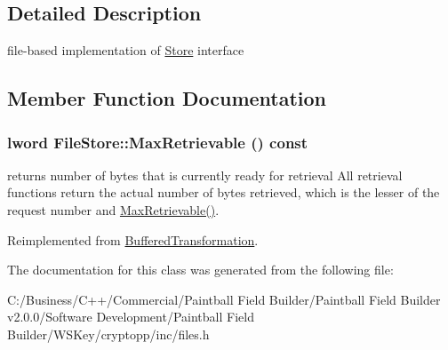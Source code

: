 \subsection{Detailed Description}
file-\/based implementation of \hyperlink{class_store}{Store} interface 

\subsection{Member Function Documentation}
\hypertarget{class_file_store_ac003753c1e1a312cdaa6149e5f53bfb9}{
\subsubsection[{MaxRetrievable}]{\setlength{\rightskip}{0pt plus 5cm}lword FileStore::MaxRetrievable () const}}
\label{class_file_store_ac003753c1e1a312cdaa6149e5f53bfb9}


returns number of bytes that is currently ready for retrieval All retrieval functions return the actual number of bytes retrieved, which is the lesser of the request number and \hyperlink{class_file_store_ac003753c1e1a312cdaa6149e5f53bfb9}{MaxRetrievable()}. 

Reimplemented from \hyperlink{class_buffered_transformation_adf6654e3996270394552d67d2fda95d7}{BufferedTransformation}.

The documentation for this class was generated from the following file:\begin{DoxyCompactItemize}
\item 
C:/Business/C++/Commercial/Paintball Field Builder/Paintball Field Builder v2.0.0/Software Development/Paintball Field Builder/WSKey/cryptopp/inc/files.h\end{DoxyCompactItemize}
